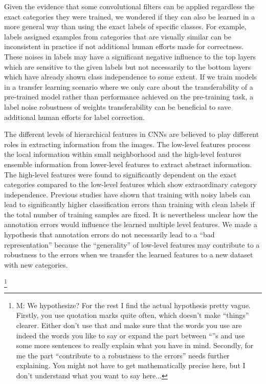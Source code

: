 Given the evidence that some convolutional filters can be applied regardless the exact categories they were trained, we wondered if they can also be learned in a more general way than using the exact labels of specific classes.
For example, labels assigned examples from categories that are visually similar can be inconsistent in practice if not additional human efforts made for correctness.
These noises in labels may have a significant negative influence to the top layers which are sensitive to the given labels but not necessarily to the bottom layers which have already shown class independence to some extent.
If we train models in a transfer learning scenario where we only care about the transferability of a pre-trained model rather than performance achieved on the pre-training task, a label noise robustness of weights transferability can be beneficial to save additional human efforts for label correction.


\noindent
The different levels of hierarchical features in CNNs are believed to play different roles in extracting information from the images.
The low-level features process the local information within small neighborhood and the high-level features ensemble information from lower-level features to extract abstract information.
The high-level features were found to significantly dependent on the exact categories compared to the low-level features which show extraordinary category independence.\cite{yosinski2014transferable}
Previous studies\cite{sukhbaatar2014training,patrini2016making} have shown that training with noisy labels can lead to significantly higher classification errors than training with clean labels if the total number of training samples are fixed.
It is nevertheless unclear how the annotation errors would influence the learned multiple level features.
We made a hypothesis that annotation errors do not necessarily lead to a ``bad representation'' because the ``generality'' of low-level features may contribute to a robustness to the errors when we transfer the learned features to a new dataset with new categories.

\footnote{M: We hypothesize?
For the rest I find the actual hypothesis pretty vague.  Firstly, you use quotation marks quite often, which doesn't make ``things'' clearer.  Either don't use that and make sure that the words you use are indeed the words you like to say or expand the part between ``''s and use some more sentences to really explain what you have in  mind.  Secondly, for me the part ``contribute to a robustness to the errors'' needs further explaining.  You might not have to get mathematically precise here, but I don't understand what you want to say here...}

